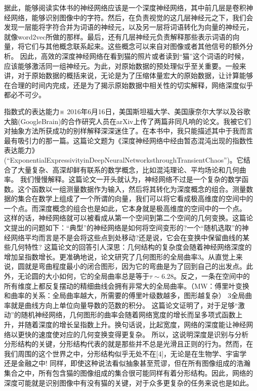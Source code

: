 据此，能够阅读实体书的神经网络应该是一个深度神经网络，其中前几层是卷积神经网络，能够识别图像中的字符。然后，在负责视觉的这几层神经元之下，我们会发现一层能将字符合并为词语的神经元，以及另一层将词语转化为向量的神经元，就像word2vec所做的那样。最后，还有几层神经元负责解释那些表示词语的向量，将它们与其他概念联系起来。这些概念可以来自对图像或者其他信号的额外分析。
因此，高效的深度神经网络在看到猫的照片或者读到“猫”这个词语的时候，应该能够激活同一组神经元。为此，对原始数据的预处理似乎至关重要。一般来讲，对于原始数据的概括来说，无论是为了压缩体量宏大的原始数据，让计算能够在合理的时间内完成，还是为了揭示原始数据中相关性的切实解释，网络深度似乎都必不可少。


指数式的表达能力※
2016年6月16日，美国斯坦福大学、美国康奈尔大学以及谷歌大脑(GoogleBrain)的合作研究人员在arXiv上传了两篇非同凡响的论文。我被它们对抽象方法所获成功的别样解释深深迷住了。在本书中，我只能描述其中于我而言最有吸引力的那一篇。这篇论文题为《深度神经网络中经由暂态混沌出现的指数性表达能力》(“ExponentialExpressivityinDeepNeuralNetworksthroughTransientChaos”)。它结合了大量复杂、高深却鲜有联系的数学概念，比如混沌理论、平均场论和几何曲率。
我们慢慢解释。这篇论文一开头就认为，神经网络不过是一个复杂的数学函数。这个函数以一组测量数据作为输入，然后将其转化为深度概念的组合。测量数据的集合在数学上组成了一个所谓的向量，我们可以将它看成极高维度的空间中的一个点。而深度概念的组合也是如此，它本身就是极高维度的空间中的一个点。
这样的话，神经网络就可以被看成从第一个空间到第二个空间的几何变换。这篇论文提出的问题如下：“典型”的神经网络是如何将空间变形的?一个“随机选取”的神经网络平均而言是不是会将这些点到处移动?还是说，它会在变换中保留曲线的某些几何特性?
这篇论文的回答引人深思：几何结构的复杂度会随着神经网络深度的增加呈指数增长。更准确地说，论文研究了几何图形的全局曲率3。从直觉上来说，圆就是弯曲程度最小的闭合图形，因为它的弯曲是为了回到自己的出发点。此外，无论圆的大小如何，它的全局曲率总是等于$\tau\sim 6.28$。反之，一条在空间中的所有维度上都反复摆动的精细曲线会拥有非常大的全局曲率。（MW：傅里叶变换和曲率的关系：全局曲率越大，所需要的傅里叶级数越多，图形越复杂）
3全局曲率就是曲线方向上单位向量导数的范数的积分。
这篇论文证明了，对于足够“激动”的随机神经网络，几何图形的曲率会随着网络宽度的增长而呈多项式函数上升，并随着深度的增长呈指数上升。换句话说，比起宽度，网络的深度能让神经网络以更快的速度使对应的几何变换变得更复杂。
所以，这说明深度是识别与分析分形结构的关键，分形结构代表的就是那些并不总是光滑且正则的行为。然而，在我们周围的这个世界之中，分形结构似乎无处不在[4]，无论是在生物学、宇宙学还是金融之中!
同样，即使这种说法看似抽象甚至荒谬，但在所有图像组成的浩瀚集合之中，所有包含猫的图像组成的集合很可能同样有着分形结构。因此，网络的深度可能就是识别图像中有没有猫的关键，对于众多更复杂的任务来说也是如此。